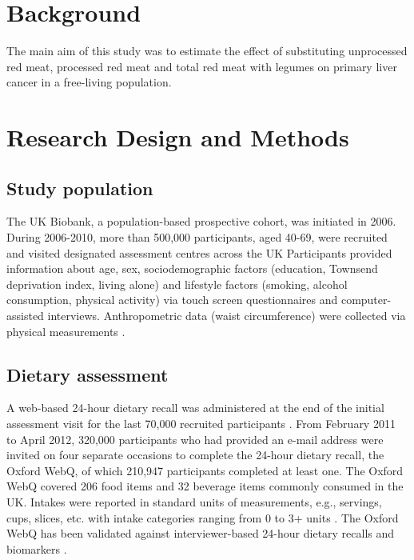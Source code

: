 \documentclass[sn-basic,Numbered,iicol,pdflatex]{sn-jnl}
\begin{document}



\maketitle

\hypertarget{sec1}{%
\section{Background}\label{sec1}}

The main aim of this study was to estimate the effect of substituting
unprocessed red meat, processed red meat and total red meat with legumes
on primary liver cancer in a free-living population.

\hypertarget{sec2}{%
\section{Research Design and Methods}\label{sec2}}

\hypertarget{subsec1}{%
\subsection{Study population}\label{subsec1}}

The UK Biobank, a population-based prospective cohort, was initiated in
2006. \citep{sudlow2015} During 2006-2010, more than 500,000 participants,
aged 40-69, were recruited and visited designated assessment centres
across the UK Participants provided information about age, sex,
sociodemographic factors (education, Townsend deprivation index, living
alone) and lifestyle factors (smoking, alcohol consumption, physical
activity) via touch screen questionnaires and computer-assisted
interviews. Anthropometric data (waist circumference) were collected via
physical measurements \citep{RN113}.

\hypertarget{subsec2}{%
\subsection{Dietary assessment}\label{subsec2}}

A web-based 24-hour dietary recall was administered at the end of the
initial assessment visit for the last 70,000 recruited participants
\citep{RN115}. From February 2011 to April 2012, 320,000 participants who had
provided an e-mail address were invited on four separate occasions to
complete the 24-hour dietary recall, the Oxford WebQ, of which 210,947
participants completed at least one. The Oxford WebQ covered 206 food
items and 32 beverage items commonly consumed in the UK. Intakes were
reported in standard units of measurements, e.g., servings, cups,
slices, etc. with intake categories ranging from 0 to 3+ units
\citep{piernas2021}. The Oxford WebQ has been validated against
interviewer-based 24-hour dietary recalls and biomarkers \citep{Liu2011, Greenwood2019}.
\end{document}
